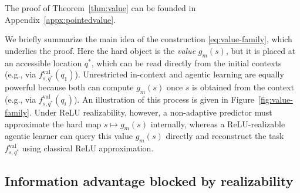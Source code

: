 \documentclass{article}
\begin{document}
The proof of Theorem~\ref{thm:value} can be founded in Appendix~\ref{appx:pointedvalue}.

We briefly summarize the main idea of the construction \eqref{eq:value-family}, which underlies the proof.
Here the hard object is the \emph{value}
$g_m(s)$, but it is placed at an accessible %
location $q^\ast$, which can be read directly from the initial contexts (e.g., via $f^{\mathrm{val}}_{s,q^\ast}(q_1)$). 
Unrestricted in-context
and agentic learning are equally powerful because both can compute $g_m(s)$ once $s$ is obtained from the context (e.g., via $f^{\mathrm{val}}_{s,q^\ast}(q_i)$). %
An illustration of this process is given in Figure~\ref{fig:value-family}.
Under ReLU realizability, however, a non-adaptive predictor must approximate the hard map $s\mapsto g_m(s)$ internally, whereas a ReLU-realizable agentic learner can query this value $g_m(s)$
directly and %
reconstruct the %
task $f^{\mathrm{val}}_{s,q^\ast}$ using classical ReLU approximation.



\subsection{Information advantage blocked by realizability}
\label{s:Main__ss:killed-by-realizability}
\end{document}

